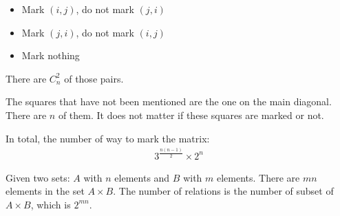             \begin{itemize}
                \item Mark $(i, j)$, do not mark $(j, i)$
                \item Mark $(j, i)$, do not mark $(i, j)$
                \item Mark nothing
            \end{itemize}
            \par There are $C^{2}_n$ of those pairs.
            \par The squares that have not been mentioned are the one on the main diagonal.
            There are $n$ of them. It does not matter if these squares are marked or not.
            \par In total, the number of way to mark the matrix:
            \begin{align*}
                3^{\frac{n(n - 1)}{2}} \times 2^{n}
            \end{align*}
            \par Given two sets: $A$ with $n$ elements and $B$ with $m$ elements. There are $mn$
            elements in the set $A \times B$. The number of relations is the number of subset of
            $A \times B$, which is $2^{mn}$.